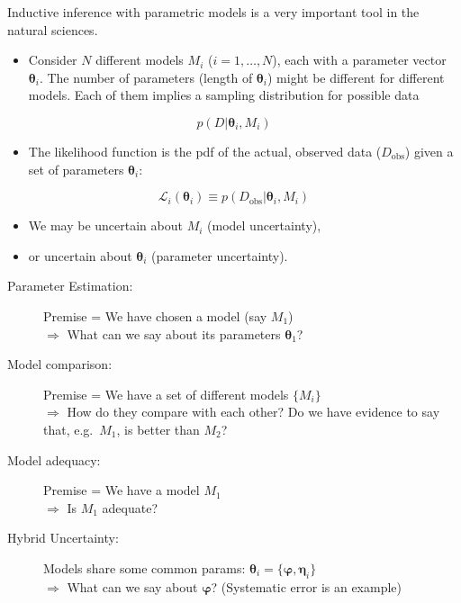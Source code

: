 \documentclass[%
oneside,                 %
final,                   %
10pt]{article}
\newenvironment{block_mdfboxadmon}[1][]{
\begin{block_mdfboxmdframed}[frametitle=#1]
}
{
\end{block_mdfboxmdframed}
}
\begin{document}
\begin{block_mdfboxadmon}[]
Inductive inference with parametric models is a very important tool in the natural sciences.
\begin{itemize}
\item Consider $N$ different models $M_i$ ($i = 1, \ldots, N$), each with a parameter vector $\boldsymbol{\theta}_i$. The number of parameters (length of $\boldsymbol{\theta}_i$) might be different for different models. Each of them implies a sampling distribution for possible data
\end{itemize}

\noindent
\[
p(D|\boldsymbol{\theta}_i, M_i)
\]

\begin{itemize}
\item The likelihood function is the pdf of the actual, observed data ($D_\mathrm{obs}$) given a set of parameters $\boldsymbol{\theta}_i$:
\end{itemize}

\noindent
\[
\mathcal{L}_i (\boldsymbol{\theta}_i) \equiv p(D_\mathrm{obs}|\boldsymbol{\theta}_i, M_i)
\]
\begin{itemize}
\item We may be uncertain about $M_i$ (model uncertainty),

\item or uncertain about $\boldsymbol{\theta}_i$ (parameter uncertainty).
\end{itemize}

\noindent
\end{block_mdfboxadmon} %




\begin{block_mdfboxadmon}[]
\begin{description}
\item[Parameter Estimation:] 
  Premise = We have chosen a model (say $M_1$)\\
  $\Rightarrow$ What can we say about its parameters $\boldsymbol{\theta}_1$?

\item[Model comparison:] 
  Premise = We have a set of different models $\{M_i\}$\\
  $\Rightarrow$ How do they compare with each other? Do we have evidence to say that, e.g.~$M_1$, is better than $M_2$?

\item[Model adequacy:] 
  Premise = We have a model $M_1$\\
  $\Rightarrow$ Is $M_1$ adequate?

\item[Hybrid Uncertainty:] 
  Models share some common params: $\boldsymbol{\theta}_i = \{ \boldsymbol{\varphi}, \boldsymbol{\eta}_i\}$\\
  $\Rightarrow$ What can we say about $\boldsymbol{\varphi}$? (Systematic error is an example)
\end{description}

\noindent
\end{block_mdfboxadmon} %
\end{document}
